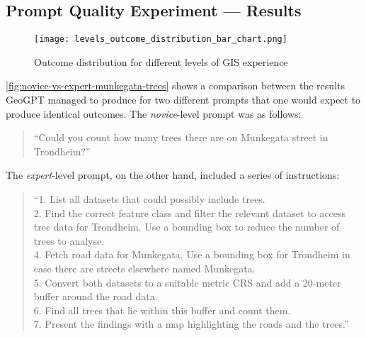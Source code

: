 \subsection{Prompt Quality Experiment --- Results}
\label{subsec:prompt-quality-test-results}

\begin{figure}[htbp]
    \centering
    \texttt{[image: levels\_outcome\_distribution\_bar\_chart.png]}
    \caption{Outcome distribution for different levels of GIS experience}
    \label{fig:outcome-distribution-experience-levels}
\end{figure}

\autoref{fig:novice-vs-expert-munkegata-trees} shows a comparison between the results GeoGPT managed to produce for two different prompts that one would expect to produce identical outcomes. The \textit{novice}-level prompt was as follows:

\begin{quote}
    \enquote{Could you count how many trees there are on Munkegata street in Trondheim?}
\end{quote}

\noindent The \textit{expert}-level prompt, on the other hand, included a series of instructions:

\begin{quote}
    \enquote{1. List all datasets that could possibly include trees. \\
        2. Find the correct feature class and filter the relevant dataset to access tree data for Trondheim. Use a bounding box to reduce the number of trees to analyse. \\
        4. Fetch road data for Munkegata. Use a bounding box for Trondheim in case there are streets elsewhere named Munkegata. \\
        5. Convert both datasets to a suitable metric CRS and add a 20-meter buffer around the road data. \\
        6. Find all trees that lie within this buffer and count them. \\
        7. Present the findings with a map highlighting the roads and the trees.}
\end{quote}

\FloatBarrier

